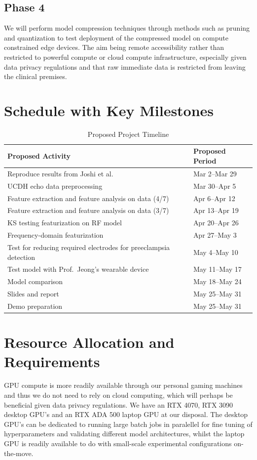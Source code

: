 \documentclass[sigconf,nonacm]{acmart}
\begin{document}
  \subsection{Phase 4}
We will perform model compression techniques through methods such as pruning and quantization to test deployment of the compressed model on compute constrained edge devices. The aim being remote accessibility rather than restricted to powerful compute or cloud compute infrastructure, especially given data privacy regulations and that raw immediate data is restricted from leaving the clinical premises.

  \section{Schedule with Key Milestones}

\begin{table}[H]
\caption{Proposed Project Timeline}
\label{tab:timeline}
\small
\centering
\begin{tabular}{p{}p{}}
\toprule
\textbf{Proposed Activity} & \textbf{Proposed Period} \\
\midrule
Reproduce results from Joshi et al.\ \cite{joshi2025linkingecgecho} & Mar 2--Mar 29 \\
UCDH echo data preprocessing & Mar 30--Apr 5 \\
Feature extraction and feature analysis on data (4/7) & Apr 6--Apr 12 \\
Feature extraction and feature analysis on data (3/7) & Apr 13--Apr 19 \\
KS testing featurization on RF model & Apr 20--Apr 26 \\
Frequency-domain featurization & Apr 27--May 3 \\
Test for reducing required electrodes for preeclampsia detection & May 4--May 10 \\
Test model with Prof.\ Jeong's wearable device & May 11--May 17 \\
Model comparison & May 18--May 24 \\
Slides and report & May 25--May 31 \\
Demo preparation & May 25--May 31 \\
\bottomrule
\end{tabular}
\end{table}

  \section{Resource Allocation and Requirements}
GPU compute is more readily available through our personal gaming machines and thus we do not need to rely on cloud computing, which will perhaps be beneficial given data privacy regulations. We have an RTX 4070, RTX 3090 desktop GPU's and an RTX ADA 500 laptop GPU at our disposal. The desktop GPU's can be dedicated to running large batch jobs in paralellel for fine tuning of hyperparameters and validating different model architectures, whilst the laptop GPU is readily available to do with small-scale experimental configurations on-the-move.
\end{document}
